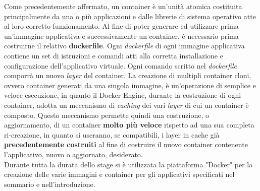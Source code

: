 Come precedentemente affermato, un container è un'unità atomica costituita principalmente da una o più applicazioni e dalle librerie di sistema operativo atte al loro corretto funzionamento.
Al fine di poter generare ed utilizzare prima un'immagine applicativa e successivamente un container, è necessario prima costruirne il relativo \textbf{\gls{dockerfile}}.
Ogni \textit{dockerfile} di ogni immagine applicativa contiene un set di istruzioni e comandi atti alla corretta installazione e configurazione dell'applicativo virtuale. Ogni comando scritto nel \textit{dockerfile} comporrà un nuovo \textit{layer} del container.
La creazione di multipli container cloni, ovvero container generati da una singola immagine, è un'operazione di semplice e veloce esecuzione, in quanto il Docker Engine, durante la costruzione di ogni container, adotta un meccanismo di \textit{\gls{caching}} dei vari \textit{\gls{layer}} di cui un container è composto. Questo meccanismo permette quindi una costruzione, o aggiornamento, di un container \textbf{molto più veloce} rispetto ad una sua completa ri-creazione, in quanto si useranno, se compatibili, i layer in cache già \textbf{precedentemente costruiti} al fine di costruire il nuovo container contenente l'applicativo, nuovo o aggiornato, desiderato.\\
Durante tutta la durata dello stage si è utilizzata la piattaforma "Docker" per la creazione delle varie immagini e container per gli applicativi specificati nel sommario e nell'introduzione.

